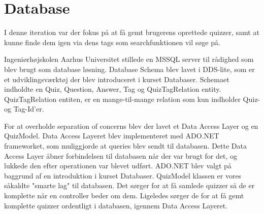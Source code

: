 \chapter{Database}
I denne iteration var der fokus på at få gemt brugerens oprettede quizzer, samt at kunne finde dem igen via dens tags som searchfunktionen vil søge på. 

Ingeniørhøjskolen Aarhus Universitet stillede en MSSQL server til rådighed som blev brugt som database løsning. Database Schema blev lavet i DDS-lite, som er et udviklingsværktøj der blev introduceret i kurset Databaser. Schemaet indholdte en Quiz, Question, Answer, Tag og QuizTagRelation entity. QuizTagRelation entiten, er en mange-til-mange relation som kun indholder Quiz- og Tag-Id'er.


For at overholde separation of concerns blev der lavet et Data Access Layer og en QuizModel. Data Access Layeret blev implementeret med ADO.NET frameworket, som muliggjorde at queries blev sendt til databasen. Dette Data Access Layer åbner forbindelsen til databasen når der var brugt for det, og lukkede den efter operationen var blevet udført. ADO.NET blev valgt på baggrund af en introduktion i kurset Databaser. QuizModel klassen er vores såkaldte "smarte lag" til databasen. Det sørger for at få samlede quizzer så de er komplette når en controller beder om dem. Ligeledes sørger de for at få gemt komplette quizzer ordentligt i databasen, igennem Data Access Layeret.



